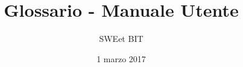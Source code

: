 



\title{\textbf{Glossario - Manuale Utente}}
\author{SWEet BIT}

\date{1 marzo 2017}
\setcounter{tocdepth}{4}


\makeFrontPage


\tableofcontents
\newpage






